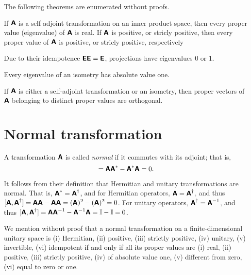 The following theorems are enumerated without proofs.

If $\textsf{\textbf{A}}$
is a self-adjoint transformation on an inner product space, then every proper value (eigenvalue)  of $\textsf{\textbf{A}}$
is real.
If $\textsf{\textbf{A}}$ is positive, or stricly positive,
then every proper value of  $\textsf{\textbf{A}}$ is positive, or stricly positive, respectively

Due to their idempotence $\textsf{\textbf{E}}\textsf{\textbf{E}}=\textsf{\textbf{E}}$,
projections have eigenvalues $0$ or $1$.

Every eigenvalue of an isometry has absolute value one.

If  $\textsf{\textbf{A}}$  is either a self-adjoint transformation or an isometry,
then proper vectors of $ \textsf{\textbf{A}}$
belonging to distinct proper values are orthogonal.


\section{Normal transformation}
\label{2014-m-fdvs-normality}

A transformation $\textsf{\textbf{A}}$ is called {\em normal}
if it commutes with its adjoint; that is,
\begin{equation}
[\textsf{\textbf{A}},\textsf{\textbf{A}}^*]= \textsf{\textbf{A}}\textsf{\textbf{A}}^* -
\textsf{\textbf{A}}^* \textsf{\textbf{A}} =0.
\end{equation}


It follows from their definition that Hermitian and unitary transformations are normal. That is,
$\textsf{\textbf{A}}^\ast =\textsf{\textbf{A}}^\dagger$,
and for Hermitian operators,
$\textsf{\textbf{A}}=\textsf{\textbf{A}}^\dagger$,
and thus
$[\textsf{\textbf{A}},\textsf{\textbf{A}}^\dagger]= \textsf{\textbf{A}}\textsf{\textbf{A}} -
\textsf{\textbf{A}} \textsf{\textbf{A}} =(\textsf{\textbf{A}})^2 -(\textsf{\textbf{A}})^2=0$.
For unitary operators,
$\textsf{\textbf{A}}^\dagger =\textsf{\textbf{A}}^{-1}$,
and thus
$[\textsf{\textbf{A}},\textsf{\textbf{A}}^\dagger]= \textsf{\textbf{A}}\textsf{\textbf{A}}^{-1} -
\textsf{\textbf{A}}^{-1} \textsf{\textbf{A}} ={\Bbb I} -{\Bbb I} =0$.


We mention without proof that
a normal transformation on a finite-dimensional unitary space is
(i) Hermitian,
(ii) positive,
(iii) strictly positive,
(iv) unitary,
(v) invertible,
(vi) idempotent
if and only if all its proper values are
(i) real,
(ii) positive,
(iii) strictly positive,
(iv) of absolute value one,
(v) different from zero,
(vi) equal to zero or one.

